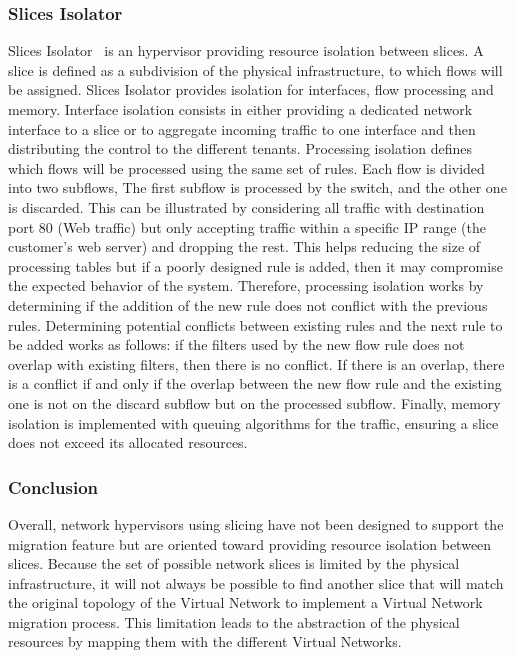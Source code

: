 \subsubsection{Slices Isolator}
Slices Isolator~\cite{SlicesIsolator-El-Azzab2011} is an hypervisor providing resource isolation between slices. A slice is defined as a subdivision of the physical infrastructure, to which flows will be assigned. Slices Isolator provides isolation for interfaces, flow processing and memory. Interface isolation consists in either providing a dedicated network interface to a slice or to aggregate incoming traffic to one interface and then distributing the control to the different tenants. Processing isolation defines which flows will be processed using the same set of rules.
Each flow is divided into two subflows,  The first subflow is processed by the switch, and the other one is discarded. This can be illustrated by considering all traffic with destination port 80 (Web traffic) but only accepting traffic within a specific IP range (the customer's web server) and dropping the rest. This helps reducing the size of processing tables but if a poorly designed rule is added, then it may compromise the expected behavior of the system. Therefore, processing isolation works by determining if the addition of the new rule does not conflict with the previous rules. Determining potential conflicts between existing rules and the next rule to be added works as follows: if the filters used by the new flow rule does not overlap with existing filters, then there is no conflict.
If there is an overlap, there is a conflict if and only if the overlap between the new flow rule and the existing one is not on the discard subflow but on the processed subflow. Finally, memory isolation is implemented with queuing algorithms for the traffic, ensuring a slice does not exceed its allocated resources. 

\subsubsection{Conclusion} 
Overall, network hypervisors using slicing have not been designed to support the migration feature but are oriented toward providing resource isolation between slices. Because the set of possible network slices is limited by the physical infrastructure, it will not always be possible to find another slice that will match the original topology of the Virtual Network to implement a Virtual Network migration process. This limitation leads to the abstraction of the physical resources by mapping them with the different Virtual Networks.

